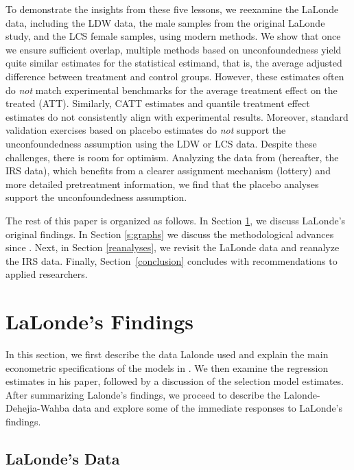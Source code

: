 \documentclass[letterpaper,12pt,leqno]{article}
\begin{document}
To demonstrate the insights from these five lessons, we reexamine the LaLonde data, including the LDW data, the male samples from the original LaLonde study, and the LCS female samples, using modern methods. We show that once we ensure sufficient overlap, multiple methods based on unconfoundedness yield quite similar estimates for the statistical estimand, that is, the average adjusted difference between treatment and control groups. However, these estimates often do {\it not} match experimental benchmarks for the average treatment effect on the treated (ATT). Similarly, CATT estimates and quantile treatment effect estimates do not consistently align with experimental results. Moreover, standard validation exercises based on placebo estimates do {\it not} support the unconfoundedness assumption using the LDW or LCS data. Despite these challenges, there is room for optimism. Analyzing the data from \citet*{imbensrubinsacerdote} (hereafter, the IRS data), which benefits from a clearer assignment mechanism (lottery) and more detailed pretreatment information, we find that the placebo analyses support the unconfoundedness assumption.

The rest of this paper is organized as follows. In Section \ref{findings}, we discuss LaLonde's original findings. In Section \ref{s:graphs} we discuss the methodological advances since \citet{LaLonde}. Next, in Section \ref{reanalyses}, we revisit the LaLonde data and reanalyze the IRS data. Finally, Section~\ref{conclusion} concludes with recommendations to applied researchers.

\section{LaLonde's Findings}\label{findings}

In this section, we first describe the data Lalonde used and explain the main econometric specifications of the models in \citet{LaLonde}. We then examine the regression estimates in his paper, followed by a discussion of the selection model estimates. After summarizing Lalonde's findings, we proceed to describe the Lalonde-Dehejia-Wahba data and explore some of the immediate responses to LaLonde's findings. 

\subsection{LaLonde's Data}
\end{document}
